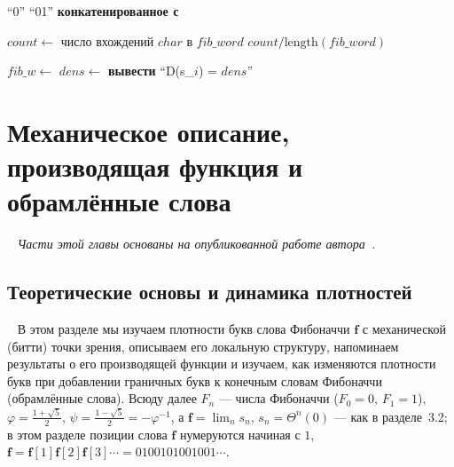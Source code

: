 \documentclass[a4paper,14pt]{extreport}
\theoremstyle{plain}
\theoremstyle{definition}
\theoremstyle{remark}
\begin{document}
\begin{algorithm}[H]
	\caption{Алгоритм вычисления плотности букв в словах Фибоначчи}\label{algorithm1}
	\begin{algorithmic}[1]
		\State \Return ``0''
		\State \Return ``01''
		\Else
		\State \Return {} \textbf{конкатенированное с} 
		\EndIf
		\EndProcedure
		
		\State $count \gets$ число вхождений $char$ в $fib\_word$
		\State \Return $count / \text{length}(fib\_word)$
		\EndFunction
		
		\State $fib\_w \gets$ 
		\State $dens \gets$ 
		\State \textbf{вывести} ``D(s\_$i$) = $dens$''
		\EndFor
		\EndProcedure
	\end{algorithmic}
\end{algorithm}
\section{Механическое описание, производящая функция и обрамлённые слова}~\label{sec3.5}
\noindent\textit{Части этой главы основаны на опубликованной работе автора~\cite{HamoudAbdullah}.}

\subsection{Теоретические основы и динамика плотностей}~\label{sec3.5.1}
\label{sec02}
В этом разделе мы изучаем плотности букв слова Фибоначчи $\mathbf f$ с механической (битти) точки зрения, описываем его локальную структуру, напоминаем результаты о его производящей функции	и изучаем, как изменяются плотности букв при добавлении граничных букв к конечным
словам Фибоначчи (обрамлённые слова). Всюду далее $F_n$ --- числа Фибоначчи ($F_0=0$, $F_1=1$),
$\varphi=\frac{1+\sqrt5}{2}$, $\psi=\frac{1-\sqrt5}{2}=-\varphi^{-1}$, а $\mathbf f=\lim_n s_n$,
$s_n=\Theta^n(0)$ --- как в разделе~3.2; в этом разделе позиции слова $\mathbf f$ нумеруются начиная с 	$1$, $\mathbf f=\mathbf f[1]\mathbf f[2]\mathbf f[3]\cdots=0100101001001\cdots$. 

\end{document}
